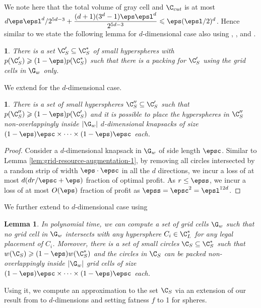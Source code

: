 \documentclass[10pt,a4paper]{article}
\newtheorem{lemma}{Lemma}[section]
\theoremstyle{plain}
\theoremstyle{plain}
\newtheorem{lem}[theorem]{\protect\lemmaname}
\theoremstyle{plain}
\theoremstyle{definition}
\providecommand{\lemmaname}{Lemma}
\begin{document}
{	We note here that the total volume of gray cell and \(\C_{cut}\) is at most \(d\eps\epsl^d/2^{5d-3}+\dfrac{(d+1)(3^d-1)\eps\epsl^d}{2^{5d-3}} \leqslant \eps (\epsl/2)^d\). Hence similar to  we state the following lemma for $d$-dimensional case also using , , and .
	\begin{lem}
		\label{lem:small-circles-white-grid-cells-d}
		There
		is a set $\C'_S \subseteq \C^*_S$ of small hyperspheres with
		$p(\C'_S)\geqslant (1-\eps) p(\C^*_S)$
		such that there is a packing for $\C'_S$ using the grid cells in $\G_w$ only.
	\end{lem}
	We extend  for the $d$-dimensional case.
	\begin{lem} \label{lem:grid-resource-augmentation-d}
		There is a set of small hyperspheres $\C''_{S}\subseteq\C'_{S}$ such that $p(\C''_{S})\geqslant(1-\eps)p(\C'_{S})$
		and it is possible to place the hyperspheres in $\C''_{S}$ non-overlappingly
		inside $|\G_{w}|$ $d$-dimensional knapsacks of size $(1-\eps)\epsc \times\cdots \times(1-\eps)\epsc$
		each. \end{lem}
	\begin{proof}
			Consider a $d$-dimensional knapsack in $\G_{w}$ of side length $\epsc$.
		Similar to Lemma \ref{lem:grid-resource-augmentation-1}, by removing all circles intersected by a random strip of width $\eps \cdot \epsc$ in all the $d$ directions, we incur a loss of at most $d(d r/\epsc + \eps)$ fraction of optimal profit. As $r\le \epss$, we incur a loss of at most $O(\eps)$ fraction of profit as $\epss = \epsc^2 = \epsl^{12d}$.
	\end{proof}
	We further extend  to $d$-dimensional case using 
	\begin{lemma}\label{lem:structured-packing-d}
		In polynomial time, we can compute a set of grid cells $\G_w$ such that no grid cell in $\G_w$ intersects with any
		hypersphere $C_i \in\C_{L}^{*}$ for any legal placement of $C_i$. Moreover, there is a set of small circles $\C_S \subseteq \C_{S}^{*}$ such that $w(\C_{S}) \geqslant (1-\eps)w(\C_{S}^{*})$ and
		the circles in $\C_S$ can be packed non-overlappingly inside $|\G_w|$ grid cells of size $(1-\eps) \epsc \times\dots\times(1-\eps) \epsc$ each.
	\end{lemma}
		Using it, we compute an approximation to the set $\C_S$ via an extension of our result from  to $d$-dimensions and setting fatness $f$ to 1 for spheres.
	
}
\end{document}
